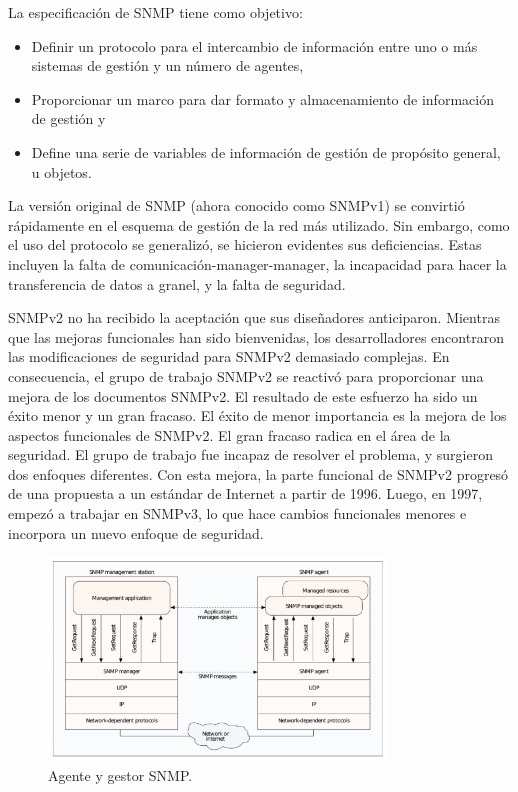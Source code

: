 \noindent
\newline
La especificación de SNMP tiene como objetivo:
\begin{itemize}
	\item Definir un protocolo para el intercambio de información entre uno o más sistemas de gestión y un número de agentes,
	\item Proporcionar un marco para dar formato y almacenamiento de información de gestión y
	\item Define una serie de variables de información de gestión de propósito general, u objetos.
\end{itemize}

\noindent
La versión original de SNMP (ahora conocido como SNMPv1) se convirtió rápidamente en el esquema de gestión de la red más utilizado. Sin embargo, como el uso del protocolo se generalizó, se hicieron evidentes sus deficiencias. Estas incluyen la falta de comunicación-manager-manager, la incapacidad para hacer la transferencia de datos a granel, y la falta de seguridad. 

\noindent
\newline
SNMPv2 no ha recibido la aceptación que sus diseñadores anticiparon. Mientras que las mejoras funcionales han sido bienvenidas, los desarrolladores encontraron las modificaciones de seguridad para SNMPv2 demasiado complejas. En consecuencia, el grupo de trabajo SNMPv2 se reactivó para proporcionar una mejora de los documentos SNMPv2.
El resultado de este esfuerzo ha sido un éxito menor y un gran fracaso. El éxito de menor importancia es la mejora de los aspectos funcionales de SNMPv2. El gran fracaso radica en el área de la seguridad. El grupo de trabajo fue incapaz de resolver el problema, y surgieron dos enfoques diferentes. Con esta mejora, la parte funcional de SNMPv2 progresó de una propuesta a un estándar de Internet a partir de 1996. Luego, en 1997, empezó a trabajar en SNMPv3, lo que hace cambios funcionales menores e incorpora un nuevo enfoque de seguridad.

\begin{figure}[htbp!]
	\centering
		\includegraphics[width=0.8\textwidth]{images/introduccion/snmp}
	\caption{Agente y gestor SNMP.}
\end{figure}

